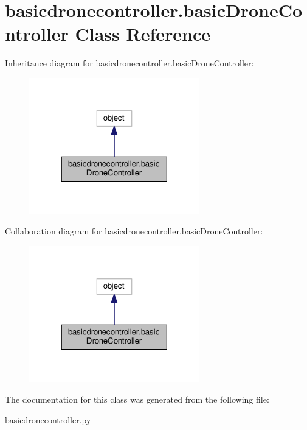 \hypertarget{classbasicdronecontroller_1_1basicDroneController}{\section{basicdronecontroller.\-basic\-Drone\-Controller Class Reference}
\label{classbasicdronecontroller_1_1basicDroneController}
}


Inheritance diagram for basicdronecontroller.\-basic\-Drone\-Controller\-:
\nopagebreak
\begin{figure}[H]
\begin{center}
\leavevmode
\includegraphics[width=210pt]{classbasicdronecontroller_1_1basicDroneController__inherit__graph}
\end{center}
\end{figure}


Collaboration diagram for basicdronecontroller.\-basic\-Drone\-Controller\-:
\nopagebreak
\begin{figure}[H]
\begin{center}
\leavevmode
\includegraphics[width=210pt]{classbasicdronecontroller_1_1basicDroneController__coll__graph}
\end{center}
\end{figure}


The documentation for this class was generated from the following file\-:\begin{DoxyCompactItemize}
\item 
basicdronecontroller.\-py\end{DoxyCompactItemize}
